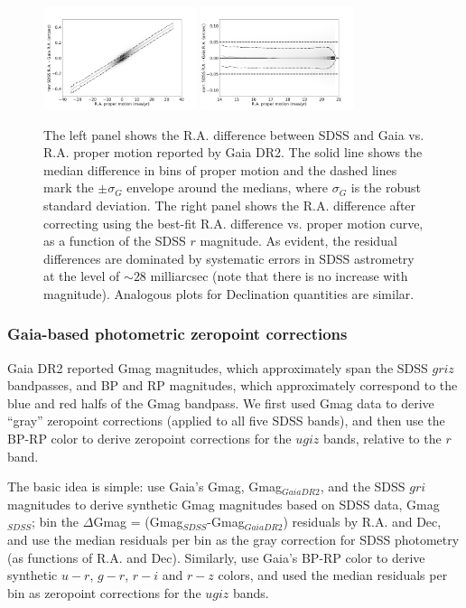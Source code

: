 \begin{figure}[t]
\centering \includegraphics[width=0.4\textwidth, keepaspectratio]{figures/astroVSpm_RA_pm.png}
\centering \includegraphics[width=0.4\textwidth, keepaspectratio]{figures/astroVSpm_RA_r.png}

\caption{The left panel shows the R.A. difference between SDSS and Gaia 
vs. R.A. proper motion reported by Gaia DR2. The solid line shows the median difference in bins 
of proper motion and the dashed lines mark the $\pm \sigma_G$ envelope around the medians,
where $\sigma_G$ is the robust standard deviation. The right panel shows the R.A. difference 
after correcting using the best-fit R.A. difference vs. 
proper motion curve, as a function of the SDSS $r$ magnitude. As evident, the residual differences are dominated 
by systematic errors in SDSS astrometry at the level of $\sim28$ milliarcsec (note that there is no increase with 
magnitude). Analogous plots for Declination quantities are similar. 
\label{fig:GaiaRApm}}
\end{figure}
  

\subsubsection{Gaia-based photometric zeropoint corrections}

Gaia DR2 reported Gmag magnitudes, which approximately span the SDSS $griz$ bandpasses, 
and BP and RP magnitudes, which approximately correspond to the blue and red halfs of the 
Gmag bandpass. We first used Gmag data to derive ``gray'' zeropoint corrections (applied to
all five SDSS bands), and then use the BP-RP color to derive zeropoint corrections for the 
$ugiz$ bands, relative to the $r$ band. 

The basic idea is simple: use Gaia's Gmag, Gmag$_{GaiaDR2}$, and the SDSS $gri$ magnitudes
to derive synthetic Gmag magnitudes based on SDSS data, Gmag$_{SDSS}$; bin the 
$\Delta$Gmag = (Gmag$_{SDSS}$-Gmag$_{GaiaDR2}$) residuals by R.A. and Dec, and 
use the median residuals per bin as the gray correction for SDSS photometry (as functions
of R.A. and Dec). Similarly, use Gaia's BP-RP color to derive synthetic $u-r$, $g-r$, $r-i$
and $r-z$ colors, and used the median residuals per bin as zeropoint corrections for 
the $ugiz$ bands. 

